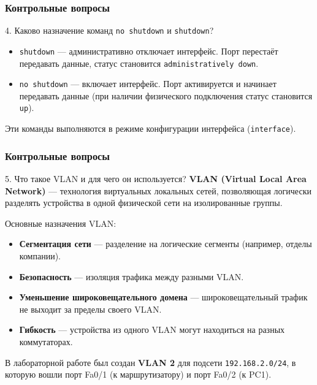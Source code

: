 \begin{frame}
\frametitle{Контрольные вопросы}
\begin{block}{4. Каково назначение команд \texttt{no shutdown} и \texttt{shutdown}?}
\begin{itemize}
    \item \texttt{shutdown} — административно отключает интерфейс. Порт перестаёт передавать данные, статус становится \texttt{administratively down}.
    \item \texttt{no shutdown} — включает интерфейс. Порт активируется и начинает передавать данные (при наличии физического подключения статус становится \texttt{up}).
\end{itemize}
Эти команды выполняются в режиме конфигурации интерфейса (\texttt{interface}).
\end{block}
\end{frame}

\begin{frame}
\frametitle{Контрольные вопросы}
\begin{block}{5. Что такое VLAN и для чего он используется?}
\textbf{VLAN (Virtual Local Area Network)} — технология виртуальных локальных сетей, позволяющая логически разделять устройства в одной физической сети на изолированные группы.

Основные назначения VLAN:
\begin{itemize}
    \item \textbf{Сегментация сети} — разделение на логические сегменты (например, отделы компании).
    \item \textbf{Безопасность} — изоляция трафика между разными VLAN.
    \item \textbf{Уменьшение широковещательного домена} — широковещательный трафик не выходит за пределы своего VLAN.
    \item \textbf{Гибкость} — устройства из одного VLAN могут находиться на разных коммутаторах.
\end{itemize}
В лабораторной работе был создан \textbf{VLAN 2} для подсети \texttt{192.168.2.0/24}, в которую вошли порт Fa0/1 (к маршрутизатору) и порт Fa0/2 (к PC1).
\end{block}
\end{frame}

